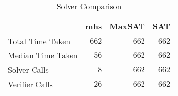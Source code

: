 \begin{table}[!h]
\caption{Solver Comparison}
\label{Ta:solver_comparison}
\begin{center}

\def\arraystretch{1.1}
\setlength\tabcolsep{7pt}

\begin{tabular}{|l|r|r|r|}
\hline

\multicolumn{1}{|c|}{} & \multicolumn{1}{|c|}{\textbf{mhs}} & \multicolumn{1}{|c|}{\textbf{MaxSAT}} & \multicolumn{1}{|c|}{\textbf{SAT}} \\ \hline \hline
Total Time Taken & $662$ & $662$ & $662$\\ \hline
Median Time Taken & $56$ & $662$ & $662$\\ \hline
Solver Calls & $8$ & $662$ & $662$\\ \hline
Verifier Calls & $26$ & $662$ & $662$\\ \hline

\end{tabular}

\end{center}
\end{table}
